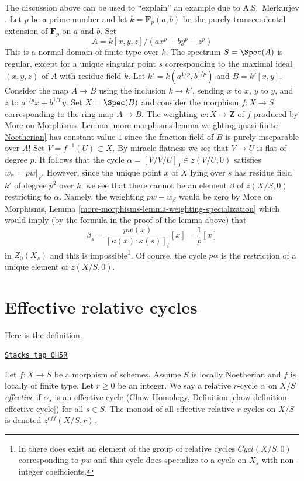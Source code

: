 \begin{example}[Merkurjev]
\label{relative-cycles-example-Merkurjev}

The discussion above can be used to ``explain'' an example due to
A.S.~Merkurjev \cite[Example 3.5.10]{SV}. Let $p$ be a prime number
and let $k = \mathbf{F}_p(a, b)$ be the purely transcendental extension
of $\mathbf{F}_p$ on $a$ and $b$. Set
$$
A = k[x, y, z]/(a x^p + b y^p - z^p)
$$
This is a normal domain of finite type over $k$. The spectrum
$S = \Spec(A)$ is regular, except for a unique singular point $s$
corresponding to the maximal ideal $(x, y, z)$ of $A$ with residue field $k$.
Let $k' = k(a^{1/p}, b^{1/p})$ and $B = k'[x, y]$. Consider the map
$A \to B$ using the inclusion $k \to k'$, sending $x$ to $x$, $y$ to $y$,
and $z$ to $a^{1/p}x + b^{1/p}y$. Set $X = \Spec(B)$ and consider the morphism
$f : X \to S$ corresponding to the ring map $A \to B$.
The weighting $w : X \to \mathbf{Z}$ of $f$
produced by More on Morphisms, Lemma
\ref{more-morphisms-lemma-weighting-quasi-finite-Noetherian}
has constant value $1$ since the fraction field of $B$ is purely inseparable
over $A$!
Set $V = f^{-1}(U) \subset X$. By miracle flatness we see that
$V \to U$ is flat of degree $p$. It follows that the cycle
$\alpha = [V/V/U]_0 \in z(V/U, 0)$ satisfies $w_\alpha = pw|_V$.
However, since the unique point $x$ of $X$ lying over $s$
has residue field $k'$ of degree $p^2$ over $k$, we see that
there cannot be an element $\beta$ of $z(X/S, 0)$ restricting to $\alpha$.
Namely, the weighting $pw - w_\beta$ would be zero by More on Morphisms,
Lemma \ref{more-morphisms-lemma-weighting-specialization} which
would imply (by the formula in the proof of the lemma above) that
$$
\beta_s = \frac{pw(x)}{[\kappa(x) : \kappa(s)]_i} [x] =
\frac{1}{p}[x]
$$
in $Z_0(X_s)$ and this is impossible\footnote{In \cite{SV} there does
exist an element of the group of relative cycles $Cycl(X/S, 0)$
corresponding to $pw$ and this cycle does specialize to a cycle
on $X_s$ with non-integer coefficients.}. Of course,
the cycle $p\alpha$ is the restriction of a unique element of
$z(X/S, 0)$.
\end{example}

\section{Effective relative cycles}
\label{relative-cycles-section-effective}
Here is the definition.

\begin{definition}[Effective]
\label{relative-cycles-definition-effective}
\href{https://stacks.math.columbia.edu/tag/0H5R}{\texttt{Stacks tag 0H5R}}

Let $f : X \to S$ be a morphism of schemes. Assume $S$ is locally Noetherian
and $f$ is locally of finite type. Let $r \geq 0$ be an integer. We say a
relative $r$-cycle $\alpha$ on $X/S$ {\it effective} if $\alpha_s$ is an
effective cycle
(Chow Homology, Definition \ref{chow-definition-effective-cycle})
for all $s \in S$. The monoid of all effective relative $r$-cycles
on $X/S$ is denoted $z^{eff}(X/S, r)$.
\end{definition}

